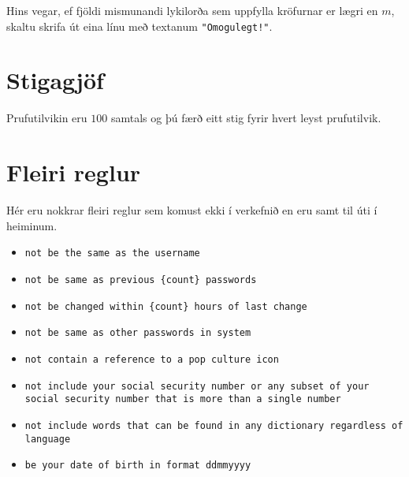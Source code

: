 Hins vegar, ef fjöldi mismunandi lykilorða sem uppfylla kröfurnar er lægri en $m$, skaltu skrifa út eina línu með textanum \texttt{"Omogulegt!"}.

\section*{Stigagjöf}
Prufutilvikin eru $100$ samtals og þú færð eitt stig fyrir hvert leyst prufutilvik.

\section*{Fleiri reglur}
Hér eru nokkrar fleiri reglur sem komust ekki í verkefnið en eru samt til úti í heiminum.
\begin{itemize}
    \item \texttt{not be the same as the username}
    \item \texttt{not be same as previous \{count\} passwords}
    \item \texttt{not be changed within \{count\} hours of last change}
    \item \texttt{not be same as other passwords in system}
    \item \texttt{not contain a reference to a pop culture icon}
    \item \texttt{not include your social security number or any subset of your social security number that is more than a single number}
    \item \texttt{not include words that can be found in any dictionary regardless of language}
    \item \texttt{be your date of birth in format ddmmyyyy}
\end{itemize}
